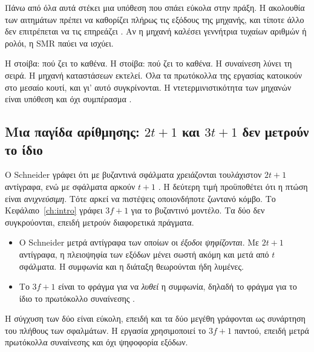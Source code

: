 Πάνω από όλα αυτά στέκει μια υπόθεση που σπάει εύκολα στην πράξη. Η
ακολουθία των αιτημάτων πρέπει να καθορίζει πλήρως τις εξόδους της
μηχανής, και τίποτε άλλο δεν επιτρέπεται να τις επηρεάζει
\cite{schneider1990implementing}. Αν η μηχανή καλέσει γεννήτρια τυχαίων
αριθμών ή ρολόι, η SMR παύει να ισχύει.

%
{Η στοίβα: πού ζει το καθένα.}%
{Η στοίβα: πού ζει το καθένα. Η συναίνεση λύνει τη σειρά. Η μηχανή
καταστάσεων εκτελεί. Όλα τα πρωτόκολλα της εργασίας κατοικούν στο μεσαίο
κουτί, και γι' αυτό συγκρίνονται. Η ντετερμινιστικότητα των μηχανών
είναι υπόθεση και όχι συμπέρασμα \cite{schneider1990implementing}.}%
{}

\subsection{Μια παγίδα αρίθμησης: $2t{+}1$ και $3t{+}1$ δεν μετρούν το
ίδιο}

Ο Schneider γράφει ότι με βυζαντινά σφάλματα χρειάζονται τουλάχιστον
$2t{+}1$ αντίγραφα, ενώ με σφάλματα  αρκούν $t{+}1$
\cite{schneider1990implementing}. Η δεύτερη τιμή προϋποθέτει ότι η πτώση
είναι \emph{ανιχνεύσιμη}. Τότε αρκεί να πιστέψεις οποιονδήποτε ζωντανό
κόμβο. Το Κεφάλαιο~\ref{ch:intro} γράφει $3f{+}1$ για το βυζαντινό
μοντέλο. Τα δύο δεν συγκρούονται, επειδή μετρούν διαφορετικά πράγματα.

\begin{itemize}
  \item Ο Schneider μετρά αντίγραφα των οποίων οι \emph{έξοδοι
  ψηφίζονται}. Με $2t{+}1$ αντίγραφα, η πλειοψηφία των εξόδων μένει
  σωστή ακόμη και μετά από $t$ σφάλματα. Η συμφωνία και η διάταξη
  θεωρούνται ήδη λυμένες.
  \item Το $3f{+}1$ είναι το φράγμα για να \emph{λυθεί} η συμφωνία,
  δηλαδή το φράγμα για το ίδιο το πρωτόκολλο συναίνεσης
  \cite{pease1980reaching}.
\end{itemize}

Η σύγχυση των δύο είναι εύκολη, επειδή και τα δύο μεγέθη γράφονται ως
συνάρτηση του πλήθους των σφαλμάτων. Η εργασία χρησιμοποιεί το $3f{+}1$
παντού, επειδή μετρά πρωτόκολλα συναίνεσης και όχι ψηφοφορία εξόδων.

